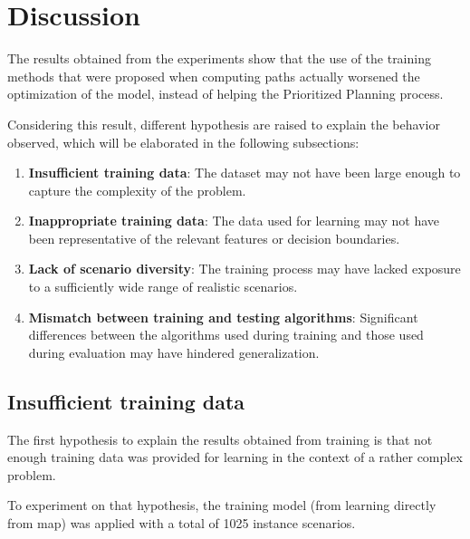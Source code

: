 \section{Discussion}

The results obtained from the experiments show that the use of the training methods that were proposed when computing paths actually worsened the optimization of the model, instead of helping the Prioritized Planning process.

Considering this result, different hypothesis are raised to explain the behavior observed, which will be elaborated in the following subsections:
\begin{enumerate}
\item \textbf{Insufficient training data}: The dataset may not have been large enough to capture the complexity of the problem.
\item \textbf{Inappropriate training data}: The data used for learning may not have been representative of the relevant features or decision boundaries.
\item \textbf{Lack of scenario diversity}: The training process may have lacked exposure to a sufficiently wide range of realistic scenarios.
\item \textbf{Mismatch between training and testing algorithms}: Significant differences between the algorithms used during training and those used during evaluation may have hindered generalization.
\end{enumerate}

\subsection{Insufficient training data}

The first hypothesis to explain the results obtained from training is that not enough training data was provided for learning in the context of a rather complex problem.

To experiment on that hypothesis, the training model (from learning directly from map) was applied with a total of 1025 instance scenarios.

